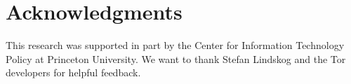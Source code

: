 \section*{Acknowledgments}
This research was supported in part by the Center for Information Technology
Policy at Princeton University.  We want to thank Stefan Lindskog and the Tor
developers for helpful feedback.
